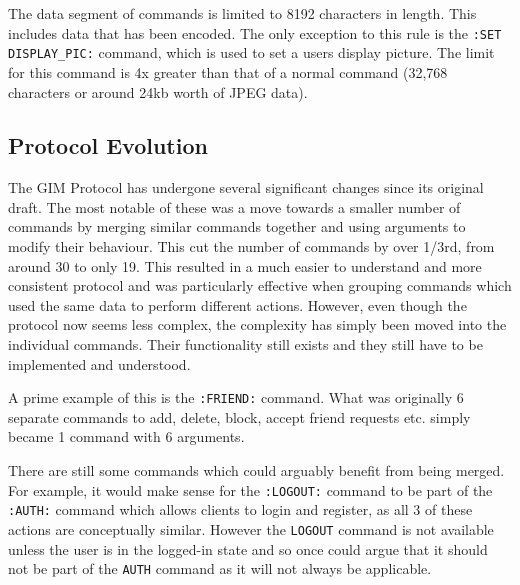 The data segment of commands is limited to 8192 characters in length. This includes data that has been encoded. The only exception to this rule is the \texttt{:SET DISPLAY\_PIC:} command, which is used to set a users display picture. The limit for this command is 4x greater than that of a normal command (32,768 characters or around 24kb worth of JPEG data).


\subsection{Protocol Evolution}

The GIM Protocol has undergone several significant changes since its original draft. The most notable of these was a move towards a smaller number of commands by merging similar commands together and using arguments to modify their behaviour. This cut the number of commands by over 1/3rd, from around 30 to only 19. This resulted in a much easier to understand and more consistent protocol and was particularly effective when grouping commands which used the same data to perform different actions. However, even though the protocol now seems less complex, the complexity has simply been moved into the individual commands. Their functionality still exists and they still have to be implemented and understood.

A prime example of this is the \texttt{:FRIEND:} command. What was originally 6 separate commands to add, delete, block, accept friend requests etc. simply became 1 command with 6 arguments.

There are still some commands which could arguably benefit from being merged. For example, it would make sense for the \texttt{:LOGOUT:} command to be part of the \texttt{:AUTH:} command which allows clients to login and register, as all 3 of these actions are conceptually similar. However the \texttt{LOGOUT} command is not available unless the user is in the logged-in state and so once could argue that it should not be part of the \texttt{AUTH} command as it will not always be applicable.





